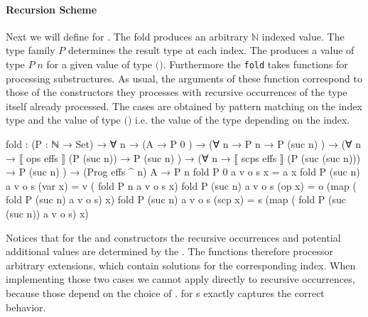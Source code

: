 \paragraph{Recursion Scheme} Next we will define  for
\AgdaSpace{}\AgdaSpace{}.
The fold produces an arbitrary $\mathbb{N}$ indexed value.
The type family $P$ determines the result type at each index.
The  produces a value of type $P\;n$ for a given value of
type
$($\AgdaSpace{}\AgdaSpace{}\AgdaFunction{\textasciicircum}\AgdaSpace{}$)$\AgdaSpace{}.
Furthermore the \texttt{fold} takes functions for processing substructures.
As usual, the arguments of these function correspond to those of the
constructors they processes with recursive occurrences of the type itself already
processed.
The cases are obtained by pattern matching on the index type and the value of
type
$($\AgdaSpace{}\AgdaSpace{}\AgdaFunction{\textasciicircum}\AgdaSpace{}$)$\AgdaSpace{}
i.e. the value of the type depending on the index.

\begin{code}
fold : (P : ℕ → Set) → ∀ n →
  (A                                           → P 0        )  →
  (∀ {n} → P n                                 → P (suc n)  )  →
  (∀ {n} → ⟦ ops   effs  ⟧  (P (suc n))        → P (suc n)  )  →
  (∀ {n} → ⟦ scps  effs  ⟧  (P (suc (suc n)))  → P (suc n)  )  →
  (Prog effs ^ n) A → P n
fold P 0        a v o s x         = a  x
fold P (suc n)  a v o s (var  x)  = v  (       fold P n              a v o s   x)
fold P (suc n)  a v o s (op   x)  = o  (map (  fold P (suc n)        a v o s)  x)
fold P (suc n)  a v o s (scp  x)  = s  (map (  fold P (suc (suc n))  a v o s)  x)
\end{code}
Notices that for the  and
 constructors the recursive occurrences and
potential additional values are determined by the .
The functions therefore processor arbitrary  extensions,
which contain solutions for the corresponding index.
When implementing those two cases we cannot apply  directly
to recursive occurrences, because those depend on the choice of
.
 for s exactly captures the correct
behavior.

